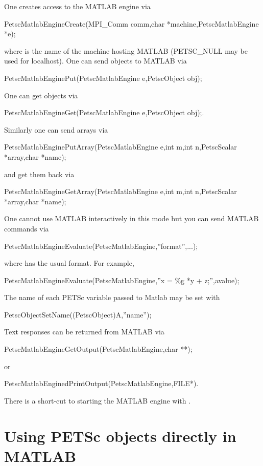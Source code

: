 One creates access to the MATLAB engine via
\begin{tabbing}
  PetscMatlabEngineCreate(MPI\_Comm comm,char *machine,PetscMatlabEngine *e);
\end{tabbing}
where  is the name of the machine hosting MATLAB (PETSC\_NULL may be used for localhost).
One can send objects to MATLAB via
\begin{tabbing}
  PetscMatlabEnginePut(PetscMatlabEngine e,PetscObject obj);
\end{tabbing}
One can get objects
via
\begin{tabbing}
  PetscMatlabEngineGet(PetscMatlabEngine e,PetscObject obj);.
\end{tabbing}
Similarly one can send arrays via
\begin{tabbing}
  PetscMatlabEnginePutArray(PetscMatlabEngine e,int m,int n,PetscScalar *array,char *name);
\end{tabbing}
and get them back via
\begin{tabbing}
  PetscMatlabEngineGetArray(PetscMatlabEngine e,int m,int n,PetscScalar *array,char *name);
\end{tabbing}
One cannot use MATLAB
interactively in this mode but you can send MATLAB commands via
\begin{tabbing}
  PetscMatlabEngineEvaluate(PetscMatlabEngine,''format'',...);
\end{tabbing}
where  has the usual  format.
For example,
\begin{tabbing}
  PetscMatlabEngineEvaluate(PetscMatlabEngine,''x = \%g *y + z;'',avalue);
\end{tabbing}
The name of each PETSc variable passed to Matlab may be set with
\begin{tabbing}
PetscObjectSetName((PetscObject)A,''name'');
\end{tabbing}

Text responses can be returned from MATLAB via
\begin{tabbing}
  PetscMatlabEngineGetOutput(PetscMatlabEngine,char **);
\end{tabbing}
or
\begin{tabbing}
PetscMatlabEnginedPrintOutput(PetscMatlabEngine,FILE*).
\end{tabbing}
There is a short-cut to starting the MATLAB engine
with .

\section{Using PETSc objects directly in MATLAB}

